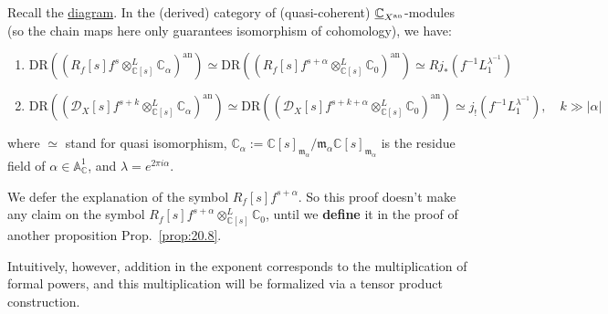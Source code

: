 \begin{lemma}\label{lemma 10.6}
    Recall the \hyperref[commutative_diagram_of_hyper_surface]{diagram}. In the (derived) category of (quasi-coherent) $\underline{\mathbb{C}}_{X^{\mathrm{an}}}$-modules (so the chain maps here only guarantees isomorphism of cohomology), we have:

    \begin{enumerate}
        \item $\mathrm{DR}\left(\left(R_f[s] f^s \otimes^L_{\mathbb{C}[s]} \mathbb{C}_\alpha\right)^{\mathrm{an}}\right) \simeq \mathrm{DR}\left(\left(R_f[s] f^{s+\alpha} \otimes^L_{\mathbb{C}[s]} \mathbb{C}_0\right)^{\mathrm{an}}\right)\simeq R j_* (f^{-1} L_1^{\lambda^{-1}})$
        \item $\mathrm{DR}\left(\left(\mathcal{D}_X[s] f^{s+k} \otimes^{L}_{\mathbb{C}[s]} \mathbb{C}_\alpha\right)^{\mathrm{an}}\right) \simeq \mathrm{DR}\left(\left(\mathcal{D}_X[s] f^{s+k+\alpha} \otimes^{L}_{\mathbb{C}[s]} \mathbb{C}_0\right)^{\mathrm{an}}\right)\simeq j_! (f^{-1} L_1^{\lambda^{-1}}), \quad k \gg |\alpha|$
    \end{enumerate}
    where $\simeq$ stand for quasi isomorphism, $\mathbb{C}_\alpha := \mathbb{C}[s]_{\mathfrak{m}_\alpha}\big/\mathfrak{m}_\alpha\mathbb{C}[s]_{\mathfrak{m}_\alpha}$ is the residue field of $\alpha \in \mathbb{A}_{\mathbb{C}}^1$, and $\lambda = e^{2\pi i \alpha}$.
\end{lemma}
\begin{remark}
    We defer the explanation of the symbol $R_f[s]f^{s+\alpha}$.
    So this proof doesn't make any claim on the symbol $R_f[s] f^{s+\alpha} \otimes^L_{\mathbb{C}[s]} \mathbb{C}_0$,
    until we \textbf{define} it in the proof of another proposition Prop.~\ref{prop:20.8}.

    Intuitively, however, addition in the exponent corresponds to the multiplication of formal powers,
    and this multiplication will be formalized via a tensor product construction.
\end{remark}
